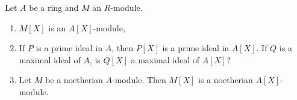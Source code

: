 Let $A$ be a ring and $M$ an $R$-module.
\begin{enumerate}[label=(\roman*)]
	\item $M[X]$ is an $A[X]$-module,
	\item If $P$ is a prime ideal in $A$, then $P[X]$ is a prime ideal in $A[X]$.
		If $Q$ is a maximal ideal of  $A$, is $Q[X]$ a maximal ideal of $A[X]$?
	\item Let $M$ be a noetherian $A$-module. Then $M[X]$ is a noetherian
		$A[X]$-module.
\end{enumerate}
